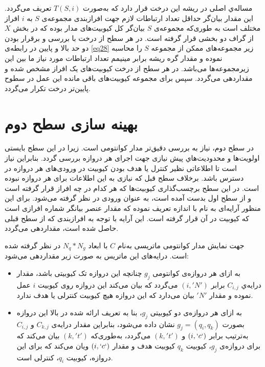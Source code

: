 مساله‌ي اصلی در ریشه این درخت قرار دارد که به‌صورت $T(S,i)$ تعریف می‌گردد. این مقدار بیان‌گر حداقل تعداد ارتباطات لازم جهت افراز‌بندی مجموعه‌ی $S$ به $i$ افراز مختلف است به طوری‌که مجموعه‌ی $S$ بیان‌گر کل کیوبیت‌های مدار بوده که در بخش $X$ از گراف دو بخشی قرار گرفته است. در هر سطح از درخت با بررسی و برقرار بودن دو حد بالا و پایین در رابطه‌ی \ref{eq28} زیر مجموعه‌های ممکن از مجموعه $S$ را محاسبه نموده و مقدار گره ریشه برابر مینیمم تعداد ارتباطات مورد نیاز ما بین این زیرمجموعه‌ها می‌باشد. در هر سطح از درخت کیوبیت‌های یک افراز مشخص شده و مقداردهی می‌گردد. سپس برای مجموعه کیوبیت‌های باقی مانده این عمل در سطوح پایین‌تر درخت تکرار می‌گردد. 
\section{بهینه سازی سطح دوم}

در سطح دوم، نیاز به بررسی دقیق‌تر مدار کوانتومی است. زیرا در این سطح بایستی اولویت‌ها و محدوديت‌هاي پیش نیازی جهت اجرای هر دروازه بررسی گردد. بنابراین نیاز است تا اطلاعاتی نظیر کنترل یا هدف بودن کیوبیت در ورودی‌های هر دروازه در دسترس باشد. برخلاف سطح قبل که نیازی به این اطلاعات برای هر دروازه نبوده است. در این سطح برچسب‌گذاری کیوبیت‌ها که هر کدام در چه افراز قرار گرفته است و از سطح اول بدست آمده است، به عنوان ورودی در نظر گرفته می‌شود. برای این منظور آرایه‌ای به نام   با اندازه  تعریف نموده که مقدار عنصر  بیانگر شماره افرازی است که کیوبیت  در آن قرار گرفته است. این آرایه با توجه به افرازبندی که از سطح قبلی حاصل شده است، مقداردهی می‌گردد.

جهت نمایش مدار کوانتومی ماتریسی به‌نام $C$ با ابعاد $N_q*N_g$ در نظر گرفته شده است. درایه‌های این ماتریس به صورت زیر مقداردهی می‌شود:
\begin{itemize}

\item
به ازای هر دروازه‌ی کوانتومی $g_{j}$ چنانچه این دروازه تک کیوبیتی باشد، مقدار درایه‌ي $C_{i,j}$ برابر  $(i,'N')$ می‌گردد که  بیان می‌کند این دروازه روی کیوبیت $i$ عمل نموده و مقدار $'N'$ بیان می‌دارد که این دروازه هیچ کیوبیت کنترلی یا هدف ندارد.
\item
به ازای هر دروازه‌ی دو کیوبیتی  $g_{j}$، بنا به تعریف ارائه شده در بالا این دروازه بصورت $g_{j}=(q_{i},q_{k})$ نشان داده می‌شود، بنابراین مقدار درایه‌ی $C_{k,j}$ و $C_{i,j}$ به‌ترتیب برابر $(i,`c`)$ و $(k,'t')$ می‌گردد، به‌طوری‌که $(k,'t')$ بیان می‌کند که برای دروازه‌ی $g_{j}$، کیوبیت $q_{k}$ کیوبیت هدف و مقدار $(i,`c`)$ ویان می‌کند که برای این دروازه، کیوبیت $q_{i}$،  کنترلی است.
\end{itemize}

